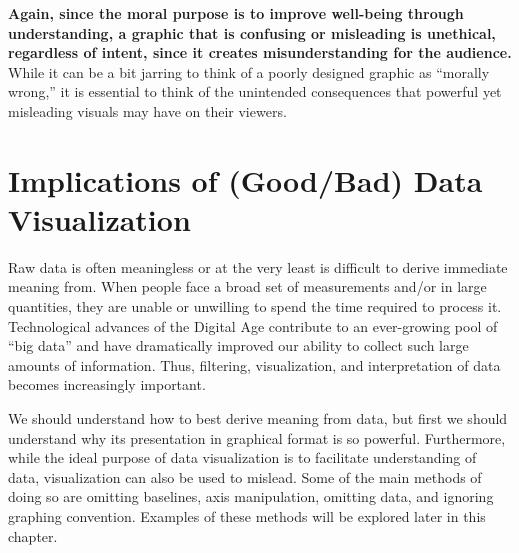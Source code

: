\documentclass[]{book}
\begin{document}
\textbf{Again, since the moral purpose is to improve well-being through understanding, a graphic that is confusing or misleading is unethical, regardless of intent, since it creates misunderstanding for the audience.} While it can be a bit jarring to think of a poorly designed graphic as ``morally wrong,'' it is essential to think of the unintended consequences that powerful yet misleading visuals may have on their viewers.

\hypertarget{implications-of-goodbad-data-visualization}{%
\section{Implications of (Good/Bad) Data Visualization}\label{implications-of-goodbad-data-visualization}}

Raw data is often meaningless or at the very least is difficult to derive immediate meaning from. When people face a broad set of measurements and/or in large quantities, they are unable or unwilling to spend the time required to process it. Technological advances of the Digital Age contribute to an ever-growing pool of ``big data'' and have dramatically improved our ability to collect such large amounts of information. Thus, filtering, visualization, and interpretation of data becomes increasingly important.

We should understand how to best derive meaning from data, but first we should understand why its presentation in graphical format is so powerful. Furthermore, while the ideal purpose of data visualization is to facilitate understanding of data, visualization can also be used to mislead. Some of the main methods of doing so are omitting baselines, axis manipulation, omitting data, and ignoring graphing convention. Examples of these methods will be explored later in this chapter.
\end{document}
